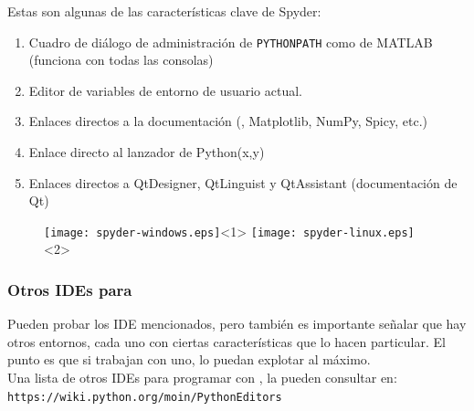 \begin{frame}[fragile]
Estas son algunas de las características clave de Spyder:
\begin{enumerate}[<+->]
\item Cuadro de diálogo de administración de \texttt{PYTHONPATH} como de MATLAB (funciona con todas las consolas)
\item Editor de variables de entorno de usuario actual.
\item Enlaces directos a la documentación (\python, Matplotlib, NumPy, Spicy, etc.)
\item Enlace directo al lanzador de Python(x,y)
\item Enlaces directos a QtDesigner, QtLinguist y QtAssistant (documentación de Qt)
\end{enumerate}
\end{frame}
\begin{frame}
\begin{figure}
	\centering
	\texttt{[image: spyder-windows.eps]}<1>
	\texttt{[image: spyder-linux.eps]}<2> 
\end{figure}
\end{frame}
\begin{frame}
\frametitle{Otros IDEs para \python}
Pueden probar los IDE mencionados, pero también es importante señalar que hay otros entornos, cada uno con ciertas características que lo hacen particular. El punto es que si trabajan con uno, lo puedan explotar al máximo.
\\
\medskip
Una lista de otros IDEs para programar con \python, la pueden consultar en:
\\
\medskip
\texttt{https://wiki.python.org/moin/PythonEditors}
\end{frame}
